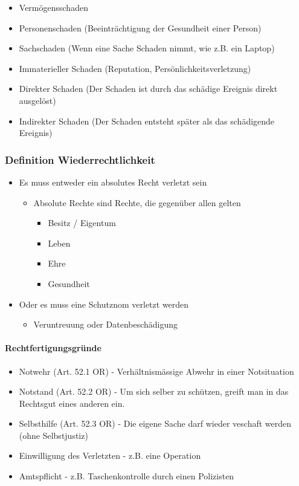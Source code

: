 \begin{itemize}
	\tightlist
	\item Vermögensschaden
	\item Personenschaden (Beeinträchtigung der Gesundheit einer Person)
	\item Sachschaden (Wenn eine Sache Schaden nimmt, wie z.B. ein Laptop)
	\item Immaterieller Schaden (Reputation, Persönlichkeitsverletzung)
	\item Direkter Schaden (Der Schaden ist durch das schädige Ereignis direkt
	ausgelöst)
	\item Indirekter Schaden (Der Schaden entsteht später als das schädigende
	Ereignis)
\end{itemize}


\subsubsection{Definition Wiederrechtlichkeit}

\begin{itemize}
	\tightlist
	\item Es muss entweder ein absolutes Recht verletzt sein
	\begin{itemize}
		\tightlist
		\item Absolute Rechte sind Rechte, die gegenüber allen gelten
		\begin{itemize}
			\tightlist
			\item Besitz / Eigentum
			\item Leben
			\item Ehre
			\item Gesundheit
		\end{itemize}
	\end{itemize}
	\item Oder es muss eine Schutznom verletzt werden
	\begin{itemize}
		\tightlist
		\item Veruntreuung oder Datenbeschädigung
	\end{itemize}
\end{itemize}


\paragraph{Rechtfertigungsgründe}
\label{sec:Haftpflichtrecht-Rechtfertigung}
\begin{itemize}
	\tightlist
	\item Notwehr (Art. 52.1 OR) - Verhältnismässige Abwehr in einer
	Notsituation
	\item Notstand (Art. 52.2 OR) - Um sich selber zu schützen, greift man in
	das Rechtsgut eines anderen ein.
	\item Selbsthilfe (Art. 52.3 OR) - Die eigene Sache darf wieder veschaft
	werden (ohne Selbstjustiz)
	\item Einwilligung des Verletzten - z.B. eine Operation
	\item Amtspflicht - z.B. Taschenkontrolle durch einen Polizisten
\end{itemize}

